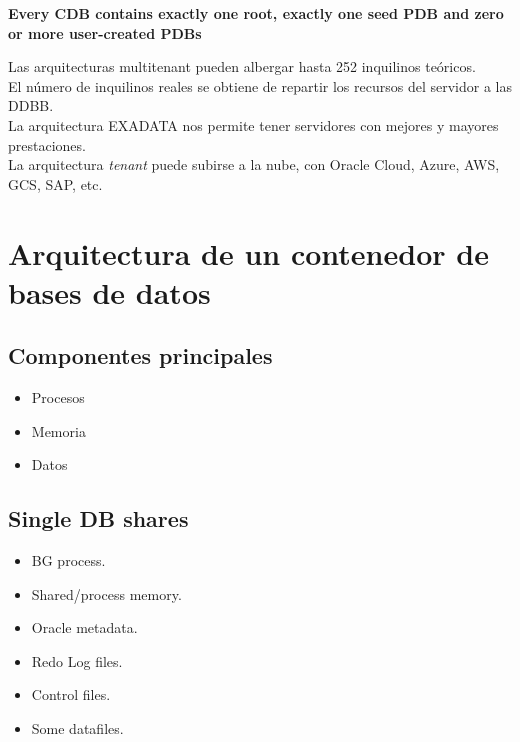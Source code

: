 \textbf{Every CDB contains exactly one root, exactly one seed PDB and zero or more user-created PDBs}

Las arquitecturas multitenant pueden albergar hasta 252 inquilinos te\'{o}ricos.\\
El n\'{u}mero de inquilinos reales se obtiene de repartir los recursos del servidor a las DDBB.\\
La arquitectura EXADATA nos permite tener servidores con mejores y mayores prestaciones.\\
La arquitectura \textit{tenant} puede subirse a la nube, con Oracle Cloud, Azure, AWS, GCS, SAP, etc.\\

\section{Arquitectura de un contenedor de bases de datos}
\subsection{Componentes principales}
\begin{itemize}
	\item Procesos
	\item Memoria
	\item Datos
\end{itemize}
\subsection{Single DB shares}
\begin{itemize}
	\item BG process.
	\item Shared/process memory.
	\item Oracle metadata.
	\item Redo Log files.
	\item Control files.
	\item Some datafiles.
\end{itemize}
